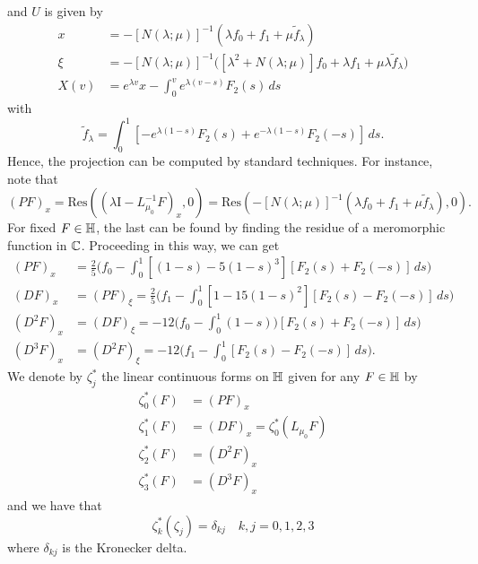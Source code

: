 and \(U\) is given by
\begin{align}
	x &= -[N(\lambda;\mu)]^{-1}(\lambda f_0 + f_1 + \mu\tilde f_\lambda) \\
	\xi &= -[N(\lambda;\mu)]^{-1} \Big( [\lambda^2 + N(\lambda;\mu)]f_0 + \lambda f_1 + \mu\lambda \tilde f_\lambda \Big) \\
	X(v) &= e^{\lambda v}x - \int_0^v e^{\lambda(v-s)} F_2(s)\, ds
\end{align}
with 
\begin{equation}
	\tilde f_\lambda = \int_0^1 [-e^{\lambda(1-s)} F_2(s) + e^{-\lambda (1-s)} F_2(-s)]\, ds.
\end{equation}
Hence, the projection can be computed by standard techniques. For instance, note that 
\begin{equation}
	(PF)_x = \mathrm{Res}((\lambda \mathrm I - L_{\mu_0} ^{-1} F)_x, 0) = \mathrm{Res}(-[N(\lambda;\mu)]^{-1}(\lambda f_0 + f_1 + \mu\tilde f_\lambda), 0).
\end{equation}
For fixed \(F\in\mathbb{H}\), the last can be found by finding the residue of a meromorphic function in \(\mathbb{C}\). Proceeding in this way, we can get 
\begin{align}
	(PF)_x &= \frac 2 5 \Bigg(  f_0 - \int_0^1[(1-s) - 5(1-s)^3][F_2(s) + F_2(-s)]\, ds \Bigg) \\
	(DF)_x &= (PF)_\xi = \frac 2 5 \Bigg(  f_1 - \int_0^1[1 - 15(1-s)^2][F_2(s) - F_2(-s)]\, ds \Bigg) \\
	(D^2F)_x &= (DF)_\xi = -12 \Bigg( f_0 - \int_0^1(1-s)) [F_2(s) + F_2(-s)]\, ds \Bigg) \\
	(D^3F)_x &= (D^2 F)_\xi = -12 \Bigg(f_1 - \int_0^1 [F_2(s) - F_2(-s)]\, ds \Bigg).
\end{align}
We denote by \(\zeta_j^*\) the linear continuous forms on \(\mathbb{H}\) given for any \(F\in\mathbb{H}\) by
\begin{equation}
	\begin{aligned}
		\zeta_0^*(F)&= (PF)_x \\
		\zeta_1^*(F) &= (DF)_x  = \zeta_0^*(L_{\mu_0} F) \\
		\zeta_2^*(F) &= (D^2F)_x  \\
		\zeta_3^*(F) &= (D^3F)_x 
	\end{aligned}
\end{equation}
and we have that
\begin{equation}
	\zeta_k^*(\zeta_j) = \delta_{kj} \quad k,j = 0, 1, 2, 3
\end{equation}
where \(\delta_{kj}\) is the Kronecker delta.

